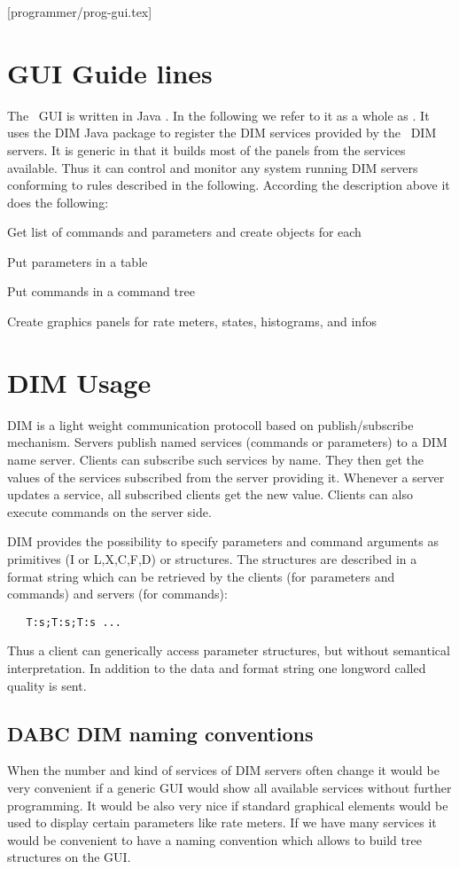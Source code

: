 [programmer/prog-gui.tex]
\section{GUI Guide lines}
The \dabc\ GUI is written in Java . In the following we refer to it
as a whole as \gui. 
It uses the DIM Java package to register the
DIM services provided by the \dabc\ DIM servers. 
It is generic in that it
builds most of the panels from the services available.
Thus it can control and monitor any system running DIM servers conforming to
rules described in the following. 
According the description above it does the following:
\begin{compactitem}[$\bullet$]
\item Get list of commands and parameters and create objects for each
\item Put parameters in a table
\item Put commands in a command tree
\item Create graphics panels for rate meters, states, histograms, and infos
\end{compactitem}

\section{DIM Usage}
DIM is a light weight communication protocoll based on publish/subscribe mechanism. Servers publish named services (commands or parameters) to a DIM name server. Clients can subscribe such services by name. They then get the values of the services subscribed from the server providing it. Whenever a server updates a service, all subscribed clients get the new value. Clients can also execute commands on the server side.

DIM provides the possibility to specify parameters and command arguments as primitives (I or L,X,C,F,D) or structures. The structures are described in a format string which can be retrieved by the clients (for parameters and commands) and servers (for commands):
\begin{verbatim}
   T:s;T:s;T:s ...
\end{verbatim}
Thus a client can generically access parameter structures, but without semantical interpretation.
In addition to the data and format string one longword called quality is sent.

\subsection{DABC DIM naming conventions}
When the number and kind of services of DIM servers often change it would be very convenient if a generic GUI would show all available services without further programming. It would be also very nice if standard graphical elements would be used to display certain parameters like rate meters. If we have many services it would be convenient to have a naming convention which allows to build tree structures on the GUI.

